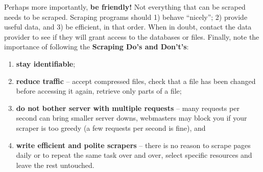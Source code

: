 \afterpage{\FloatBarrier}
\newl Perhaps more importantly, \textbf{be friendly!} Not everything that can be scraped needs to be scraped. Scraping programs should 1) behave ``nicely''; 2) provide useful data, and 3) be efficient, in that order. When in doubt, contact the data provider to see if they will grant access to the databases or files. 
\newpage\noindent Finally, note the importance of following the \textbf{Scraping Do's and Don't's}:
\begin{enumerate}[noitemsep]
    \item \textbf{stay identifiable};
    \item \textbf{reduce traffic} -- accept compressed files, check that a file has been changed before accessing it again, retrieve only parts of a file;
    \item \textbf{do not bother server with multiple requests} --  many requests per second can bring smaller server downs, webmasters may block you if your scraper is too greedy (a few requests per second is fine), and
    \item \textbf{write efficient and polite scrapers} -- there is no reason to scrape pages daily or to repeat the same task over and over, select specific resources and leave the rest untouched. 
\end{enumerate}
